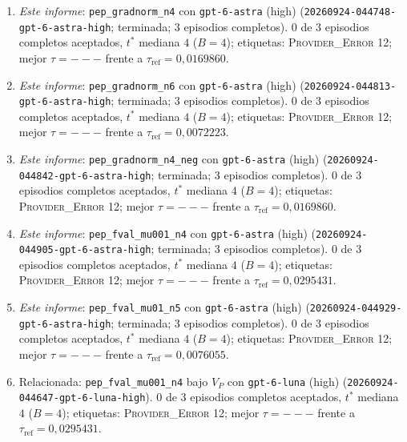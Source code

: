 \documentclass[11pt,a4paper]{article}
\begin{document}
\begin{enumerate}
  \item \emph{Este informe}: \texttt{pep\_\allowbreak{}gradnorm\_\allowbreak{}n4} con \texttt{gpt-\allowbreak{}6-\allowbreak{}astra} (high) (\texttt{20260924-\allowbreak{}044748-\allowbreak{}gpt-\allowbreak{}6-\allowbreak{}astra-\allowbreak{}high}; terminada; 3 episodios completos). 0 de 3 episodios completos aceptados, $t^*$ mediana $4$ ($B = 4$); etiquetas: \textsc{Provider\_Error} 12; mejor $\tau = ---$ frente a $\tau_{\mathrm{ref}} = 0{,}0169860$.
  \item \emph{Este informe}: \texttt{pep\_\allowbreak{}gradnorm\_\allowbreak{}n6} con \texttt{gpt-\allowbreak{}6-\allowbreak{}astra} (high) (\texttt{20260924-\allowbreak{}044813-\allowbreak{}gpt-\allowbreak{}6-\allowbreak{}astra-\allowbreak{}high}; terminada; 3 episodios completos). 0 de 3 episodios completos aceptados, $t^*$ mediana $4$ ($B = 4$); etiquetas: \textsc{Provider\_Error} 12; mejor $\tau = ---$ frente a $\tau_{\mathrm{ref}} = 0{,}0072223$.
  \item \emph{Este informe}: \texttt{pep\_\allowbreak{}gradnorm\_\allowbreak{}n4\_\allowbreak{}neg} con \texttt{gpt-\allowbreak{}6-\allowbreak{}astra} (high) (\texttt{20260924-\allowbreak{}044842-\allowbreak{}gpt-\allowbreak{}6-\allowbreak{}astra-\allowbreak{}high}; terminada; 3 episodios completos). 0 de 3 episodios completos aceptados, $t^*$ mediana $4$ ($B = 4$); etiquetas: \textsc{Provider\_Error} 12; mejor $\tau = ---$ frente a $\tau_{\mathrm{ref}} = 0{,}0169860$.
  \item \emph{Este informe}: \texttt{pep\_\allowbreak{}fval\_\allowbreak{}mu001\_\allowbreak{}n4} con \texttt{gpt-\allowbreak{}6-\allowbreak{}astra} (high) (\texttt{20260924-\allowbreak{}044905-\allowbreak{}gpt-\allowbreak{}6-\allowbreak{}astra-\allowbreak{}high}; terminada; 3 episodios completos). 0 de 3 episodios completos aceptados, $t^*$ mediana $4$ ($B = 4$); etiquetas: \textsc{Provider\_Error} 12; mejor $\tau = ---$ frente a $\tau_{\mathrm{ref}} = 0{,}0295431$.
  \item \emph{Este informe}: \texttt{pep\_\allowbreak{}fval\_\allowbreak{}mu01\_\allowbreak{}n5} con \texttt{gpt-\allowbreak{}6-\allowbreak{}astra} (high) (\texttt{20260924-\allowbreak{}044929-\allowbreak{}gpt-\allowbreak{}6-\allowbreak{}astra-\allowbreak{}high}; terminada; 3 episodios completos). 0 de 3 episodios completos aceptados, $t^*$ mediana $4$ ($B = 4$); etiquetas: \textsc{Provider\_Error} 12; mejor $\tau = ---$ frente a $\tau_{\mathrm{ref}} = 0{,}0076055$.
  \item Relacionada: \texttt{pep\_\allowbreak{}fval\_\allowbreak{}mu001\_\allowbreak{}n4} bajo $V_P$ con \texttt{gpt-\allowbreak{}6-\allowbreak{}luna} (high) (\texttt{20260924-\allowbreak{}044647-\allowbreak{}gpt-\allowbreak{}6-\allowbreak{}luna-\allowbreak{}high}). 0 de 3 episodios completos aceptados, $t^*$ mediana $4$ ($B = 4$); etiquetas: \textsc{Provider\_Error} 12; mejor $\tau = ---$ frente a $\tau_{\mathrm{ref}} = 0{,}0295431$.

\end{enumerate}
\end{document}

